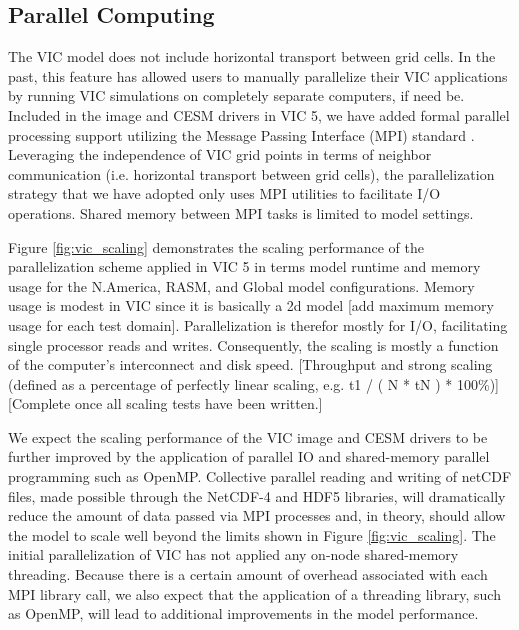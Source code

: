 \documentclass[gmd, manuscript]{copernicus}
\begin{document}
  \subsection{Parallel Computing}
    \label{sec:mpi}
    The VIC model does not include horizontal transport between grid cells.
    In the past, this feature has allowed users to manually parallelize their VIC applications by running VIC simulations on completely separate computers, if need be.
    Included in the image and CESM drivers in VIC 5, we have added formal parallel processing support utilizing the Message Passing Interface (MPI) standard \citep{Gropp_1996}.
    Leveraging the independence of VIC grid points in terms of neighbor communication (i.e. horizontal transport between grid cells), the parallelization strategy that we have adopted only uses MPI utilities to facilitate I/O operations.
    Shared memory between MPI tasks is limited to model settings.

    Figure \ref{fig:vic_scaling} demonstrates the scaling performance of the parallelization scheme applied in VIC 5 in terms model runtime and memory usage for the N.America, RASM, and Global model configurations.
    Memory usage is modest in VIC since it is basically a 2d model [add maximum memory usage for each test domain].
    Parallelization is therefor mostly for I/O, facilitating single processor reads and writes.
    Consequently, the scaling is mostly a function of the computer's interconnect and disk speed.
    [Throughput and strong scaling (defined as a percentage of perfectly linear scaling, e.g.  t1 / ( N * tN ) * 100\%)]
    [Complete once all scaling tests have been written.]

    We expect the scaling performance of the VIC image and CESM drivers to be further improved by the application of parallel IO and shared-memory parallel programming such as OpenMP.
    Collective parallel reading and writing of netCDF files, made possible through the NetCDF-4 and HDF5 libraries, will dramatically reduce the amount of data passed via MPI processes and, in theory, should allow the model to scale well beyond the limits shown in Figure \ref{fig:vic_scaling}.
    The initial parallelization of VIC has not applied any on-node shared-memory threading.
    Because there is a certain amount of overhead associated with each MPI library call, we also expect that the application of a threading library, such as OpenMP, will lead to additional improvements in the model performance.
\end{document}
